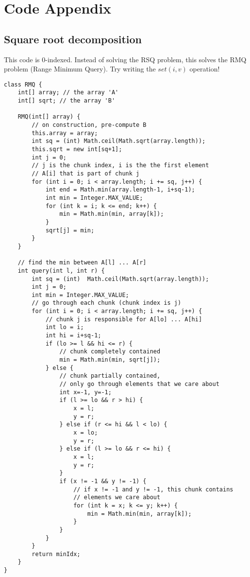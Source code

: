 \documentclass[11pt]{article}
\theoremstyle{plain}
\theoremstyle{definition}
\begin{document}
\section*{Code Appendix}
\subsection*{Square root decomposition}
This code is 0-indexed. Instead of solving the RSQ problem, this solves the RMQ problem (Range Minimum Query). Try writing the $set(i, v)$ operation!
\begin {lstlisting}
class RMQ {
	int[] array; // the array 'A'
	int[] sqrt; // the array 'B'

	RMQ(int[] array) {
		// on construction, pre-compute B
		this.array = array;
		int sq = (int) Math.ceil(Math.sqrt(array.length));
		this.sqrt = new int[sq+1];
		int j = 0;
		// j is the chunk index, i is the the first element
		// A[i] that is part of chunk j
		for (int i = 0; i < array.length; i += sq, j++) {
			int end = Math.min(array.length-1, i+sq-1);
			int min = Integer.MAX_VALUE;
			for (int k = i; k <= end; k++) {
				min = Math.min(min, array[k]);
			}
			sqrt[j] = min;
		}
	}

	// find the min between A[l] ... A[r]
	int query(int l, int r) {
		int sq = (int)  Math.ceil(Math.sqrt(array.length));
		int j = 0;
		int min = Integer.MAX_VALUE;
		// go through each chunk (chunk index is j)
		for (int i = 0; i < array.length; i += sq, j++) {
			// chunk j is responsible for A[lo] ... A[hi]
			int lo = i;
			int hi = i+sq-1;
			if (lo >= l && hi <= r) {
				// chunk completely contained
				min = Math.min(min, sqrt[j]);
			} else {
				// chunk partially contained,
				// only go through elements that we care about
				int x=-1, y=-1;
				if (l >= lo && r > hi) {
					x = l;
					y = r;
				} else if (r <= hi && l < lo) {
					x = lo;
					y = r;
				} else if (l >= lo && r <= hi) {
					x = l;
					y = r;
				}
				if (x != -1 && y != -1) {
					// if x != -1 and y != -1, this chunk contains 
					// elements we care about
					for (int k = x; k <= y; k++) {
						min = Math.min(min, array[k]);
					}
				}
			}
		}
		return minIdx;
	}
}
\end{lstlisting}
\end{document}
